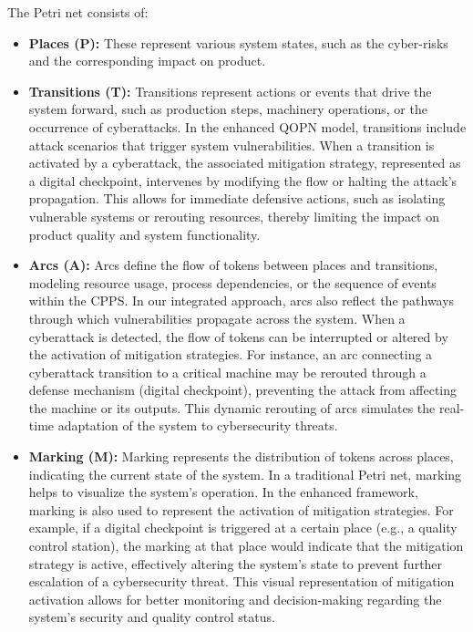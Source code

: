 \documentclass[conference]{IEEEtran}
\begin{document}
The Petri net consists of:
\begin{itemize}
    \item \textbf{Places (P):}  These represent various system states, such as the cyber-risks and the corresponding impact on product.
    \item \textbf{Transitions (T):} Transitions represent actions or events that drive the system forward, such as production steps, machinery operations, or the occurrence of cyberattacks. In the enhanced QOPN model, transitions include attack scenarios that trigger system vulnerabilities. When a transition is activated by a cyberattack, the associated mitigation strategy, represented as a digital checkpoint, intervenes by modifying the flow or halting the attack’s propagation. This allows for immediate defensive actions, such as isolating vulnerable systems or rerouting resources, thereby limiting the impact on product quality and system functionality.
    \item \textbf{Arcs (A):} Arcs define the flow of tokens between places and transitions, modeling resource usage, process dependencies, or the sequence of events within the CPPS. In our integrated approach, arcs also reflect the pathways through which vulnerabilities propagate across the system. When a cyberattack is detected, the flow of tokens can be interrupted or altered by the activation of mitigation strategies. For instance, an arc connecting a cyberattack transition to a critical machine may be rerouted through a defense mechanism (digital checkpoint), preventing the attack from affecting the machine or its outputs. This dynamic rerouting of arcs simulates the real-time adaptation of the system to cybersecurity threats.
    \item \textbf{Marking (M):}  Marking represents the distribution of tokens across places, indicating the current state of the system. In a traditional Petri net, marking helps to visualize the system's operation. In the enhanced framework, marking is also used to represent the activation of mitigation strategies. For example, if a digital checkpoint is triggered at a certain place (e.g., a quality control station), the marking at that place would indicate that the mitigation strategy is active, effectively altering the system's state to prevent further escalation of a cybersecurity threat. This visual representation of mitigation activation allows for better monitoring and decision-making regarding the system's security and quality control status.
\end{itemize}
\end{document}
